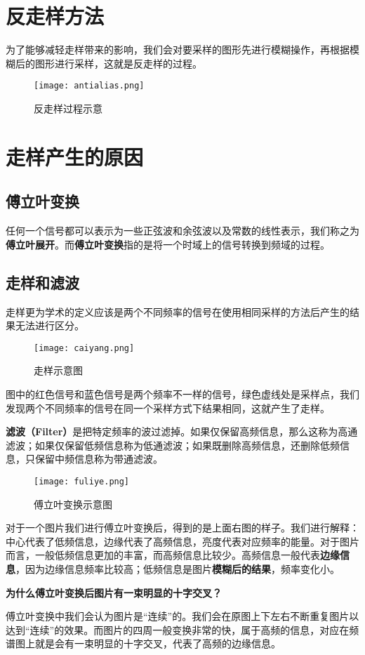 \documentclass[openany]{progbookcn}
\begin{document}
\section{反走样方法}
为了能够减轻走样带来的影响，我们会对要采样的图形先进行模糊操作，再根据模糊后的图形进行采样，这就是反走样的过程。
\begin{figure}[H]
	\centering
	\texttt{[image: antialias.png]}
	\caption{反走样过程示意}
	\label{fig:antialias}
\end{figure}

\section{走样产生的原因}
\subsection{傅立叶变换}
任何一个信号都可以表示为一些正弦波和余弦波以及常数的线性表示，我们称之为\textbf{傅立叶展开}。而\textbf{傅立叶变换}指的是将一个时域上的信号转换到频域的过程。
\subsection{走样和滤波}
走样更为学术的定义应该是两个不同频率的信号在使用相同采样的方法后产生的结果无法进行区分。
\begin{figure}[H]
	\centering
	\texttt{[image: caiyang.png]}
	\caption{走样示意图}
	\label{fig:alias}
\end{figure}
图中的红色信号和蓝色信号是两个频率不一样的信号，绿色虚线处是采样点，我们发现两个不同频率的信号在同一个采样方式下结果相同，这就产生了走样。

\textbf{滤波（Filter）}是把特定频率的波过滤掉。如果仅保留高频信息，那么这称为高通滤波；如果仅保留低频信息称为低通滤波；如果既删除高频信息，还删除低频信息，只保留中频信息称为带通滤波。

\begin{figure}[H]
	\centering
	\texttt{[image: fuliye.png]}
	\caption{傅立叶变换示意图}
	\label{fig:fuliye}
\end{figure}
对于一个图片我们进行傅立叶变换后，得到的是上面右图的样子。我们进行解释：中心代表了低频信息，边缘代表了高频信息，亮度代表对应频率的能量。对于图片而言，一般低频信息更加的丰富，而高频信息比较少。高频信息一般代表\textbf{边缘信息}，因为边缘信息频率比较高；低频信息是图片\textbf{模糊后的结果}，频率变化小。
\begin{question}
\textbf{为什么傅立叶变换后图片有一束明显的十字交叉？}

傅立叶变换中我们会认为图片是“连续”的。我们会在原图上下左右不断重复图片以达到“连续”的效果。而图片的四周一般变换非常的快，属于高频的信息，对应在频谱图上就是会有一束明显的十字交叉，代表了高频的边缘信息。
\end{question}
\end{document}
